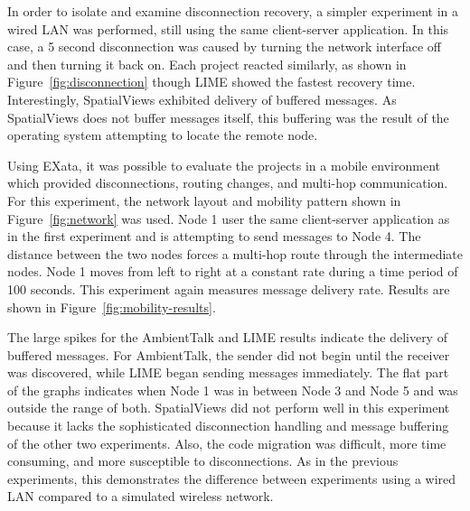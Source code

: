 In order to isolate and examine disconnection recovery, a simpler experiment in a wired LAN was performed, still using the same client-server application. In this case, a 5 second disconnection was caused by turning the network interface off and then turning it back on. Each project reacted similarly, as shown in Figure~\ref{fig:disconnection} though LIME showed the fastest recovery time. Interestingly, SpatialViews exhibited delivery of buffered messages. As SpatialViews does not buffer messages itself, this buffering was the result of the operating system attempting to locate the remote node.

Using EXata, it was possible to evaluate the projects in a mobile environment which provided disconnections, routing changes, and multi-hop communication. For this experiment, the network layout and mobility pattern shown in Figure~\ref{fig:network} was used. Node 1 user the same client-server application as in the first experiment and is attempting to send messages to Node 4. The distance between the two nodes forces a multi-hop route through the intermediate nodes. Node 1 moves from left to right at a constant rate during a time period of 100 seconds. This experiment again measures message delivery rate. Results are shown in Figure~\ref{fig:mobility-results}. 

The large spikes for the AmbientTalk and LIME results indicate the delivery of buffered messages. For AmbientTalk, the sender did not begin until the receiver was discovered, while LIME began sending messages immediately. The flat part of the graphs indicates when Node 1 was in between Node 3 and Node 5 and was outside the range of both. SpatialViews did not perform well in this experiment because it lacks the sophisticated disconnection handling and message buffering of the other two experiments. Also, the code migration was difficult, more time consuming, and more susceptible to disconnections. As in the previous experiments, this demonstrates the difference between experiments using a wired LAN compared to a simulated wireless network. 